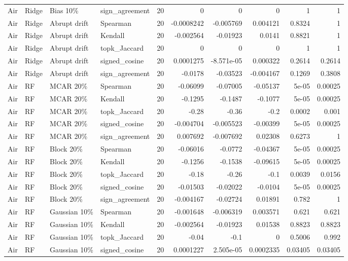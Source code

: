 \begin{tabular}{llllrrrrrr}
Air & Ridge & Bias 10\% & sign\_agreement & 20 & 0 & 0 & 0 & 1 & 1 \\
Air & Ridge & Abrupt drift & Spearman & 20 & -0.0008242 & -0.005769 & 0.004121 & 0.8324 & 1 \\
Air & Ridge & Abrupt drift & Kendall & 20 & -0.002564 & -0.01923 & 0.0141 & 0.8821 & 1 \\
Air & Ridge & Abrupt drift & topk\_Jaccard & 20 & 0 & 0 & 0 & 1 & 1 \\
Air & Ridge & Abrupt drift & signed\_cosine & 20 & 0.0001275 & -8.571e-05 & 0.000322 & 0.2614 & 0.2614 \\
Air & Ridge & Abrupt drift & sign\_agreement & 20 & -0.0178 & -0.03523 & -0.004167 & 0.1269 & 0.3808 \\
Air & RF & MCAR 20\% & Spearman & 20 & -0.06099 & -0.07005 & -0.05137 & 5e-05 & 0.00025 \\
Air & RF & MCAR 20\% & Kendall & 20 & -0.1295 & -0.1487 & -0.1077 & 5e-05 & 0.00025 \\
Air & RF & MCAR 20\% & topk\_Jaccard & 20 & -0.28 & -0.36 & -0.2 & 0.0002 & 0.001 \\
Air & RF & MCAR 20\% & signed\_cosine & 20 & -0.004704 & -0.005523 & -0.00399 & 5e-05 & 0.00025 \\
Air & RF & MCAR 20\% & sign\_agreement & 20 & 0.007692 & -0.007692 & 0.02308 & 0.6273 & 1 \\
Air & RF & Block 20\% & Spearman & 20 & -0.06016 & -0.0772 & -0.04367 & 5e-05 & 0.00025 \\
Air & RF & Block 20\% & Kendall & 20 & -0.1256 & -0.1538 & -0.09615 & 5e-05 & 0.00025 \\
Air & RF & Block 20\% & topk\_Jaccard & 20 & -0.18 & -0.26 & -0.1 & 0.0039 & 0.0156 \\
Air & RF & Block 20\% & signed\_cosine & 20 & -0.01503 & -0.02022 & -0.0104 & 5e-05 & 0.00025 \\
Air & RF & Block 20\% & sign\_agreement & 20 & -0.004167 & -0.02724 & 0.01891 & 0.782 & 1 \\
Air & RF & Gaussian 10\% & Spearman & 20 & -0.001648 & -0.006319 & 0.003571 & 0.621 & 0.621 \\
Air & RF & Gaussian 10\% & Kendall & 20 & -0.002564 & -0.01923 & 0.01538 & 0.8823 & 0.8823 \\
Air & RF & Gaussian 10\% & topk\_Jaccard & 20 & -0.04 & -0.1 & 0 & 0.5006 & 0.992 \\
Air & RF & Gaussian 10\% & signed\_cosine & 20 & 0.0001227 & 2.505e-05 & 0.0002335 & 0.03405 & 0.03405 \\

\end{tabular}
